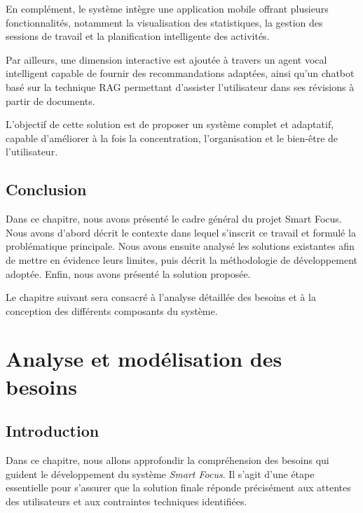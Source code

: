 \documentclass[12pt,a4paper]{report}
\begin{document}
En complément, le système intègre une application mobile offrant plusieurs fonctionnalités, notamment la visualisation des statistiques, la gestion des sessions de travail et la planification intelligente des activités.

Par ailleurs, une dimension interactive est ajoutée à travers un agent vocal intelligent capable de fournir des recommandations adaptées, ainsi qu'un chatbot basé sur la technique \ac{RAG} permettant d'assister l'utilisateur dans ses révisions à partir de documents.

L'objectif de cette solution est de proposer un système complet et adaptatif, capable d'améliorer à la fois la concentration, l'organisation et le bien-être de l'utilisateur.

\section*{Conclusion}

Dans ce chapitre, nous avons présenté le cadre général du projet Smart Focus. Nous avons d'abord décrit le contexte dans lequel s'inscrit ce travail et formulé la problématique principale. Nous avons ensuite analysé les solutions existantes afin de mettre en évidence leurs limites, puis décrit la méthodologie de développement adoptée. Enfin, nous avons présenté la solution proposée.

Le chapitre suivant sera consacré à l'analyse détaillée des besoins et à la conception des différents composants du système.

\clearpage

\chapter{Analyse et modélisation des besoins}

\section{Introduction}

Dans ce chapitre, nous allons approfondir la compréhension des besoins qui guident le développement du système \textit{Smart Focus}. Il s'agit d'une étape essentielle pour s'assurer que la solution finale réponde précisément aux attentes des utilisateurs et aux contraintes techniques identifiées.
\end{document}
